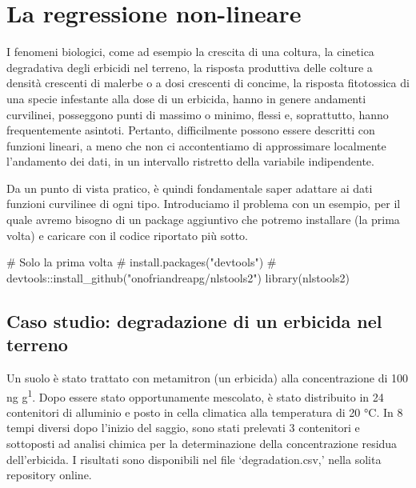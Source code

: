 \documentclass[a4paper,12pt,oneside]{book}
\newenvironment{Shaded}{\begin{snugshade}}{\end{snugshade}}
\newcommand{\CommentTok}[1]{#1}
\newcommand{\FunctionTok}[1]{#1}
\newcommand{\NormalTok}[1]{#1}
\begin{document}
\hypertarget{la-regressione-non-lineare}{%
\chapter{La regressione non-lineare}\label{la-regressione-non-lineare}}

I fenomeni biologici, come ad esempio la crescita di una coltura, la cinetica degradativa degli erbicidi nel terreno, la risposta produttiva delle colture a densità crescenti di malerbe o a dosi crescenti di concime, la risposta fitotossica di una specie infestante alla dose di un erbicida, hanno in genere andamenti curvilinei, posseggono punti di massimo o minimo, flessi e, soprattutto, hanno frequentemente asintoti. Pertanto, difficilmente possono essere descritti con funzioni lineari, a meno che non ci accontentiamo di approssimare localmente l'andamento dei dati, in un intervallo ristretto della variabile indipendente.

Da un punto di vista pratico, è quindi fondamentale saper adattare ai dati funzioni curvilinee di ogni tipo. Introduciamo il problema con un esempio, per il quale avremo bisogno di un package aggiuntivo che potremo installare (la prima volta) e caricare con il codice riportato più sotto.

\begin{Shaded}
\begin{Highlighting}[]
\CommentTok{\# Solo la prima volta}
\CommentTok{\# install.packages("devtools")}
\CommentTok{\# devtools::install\_github("onofriandreapg/nlstools2")}
\FunctionTok{library}\NormalTok{(nlstools2)}
\end{Highlighting}
\end{Shaded}

\hypertarget{caso-studio-degradazione-di-un-erbicida-nel-terreno}{%
\section{Caso studio: degradazione di un erbicida nel terreno}\label{caso-studio-degradazione-di-un-erbicida-nel-terreno}}

Un suolo è stato trattato con metamitron (un erbicida) alla concentrazione di 100 ng g\textsuperscript{1}. Dopo essere stato opportunamente mescolato, è stato distribuito in 24 contenitori di alluminio e posto in cella climatica alla temperatura di 20 °C. In 8 tempi diversi dopo l'inizio del saggio, sono stati prelevati 3 contenitori e sottoposti ad analisi chimica per la determinazione della concentrazione residua dell'erbicida. I risultati sono disponibili nel file `degradation.csv,' nella solita repository online.
\end{document}

